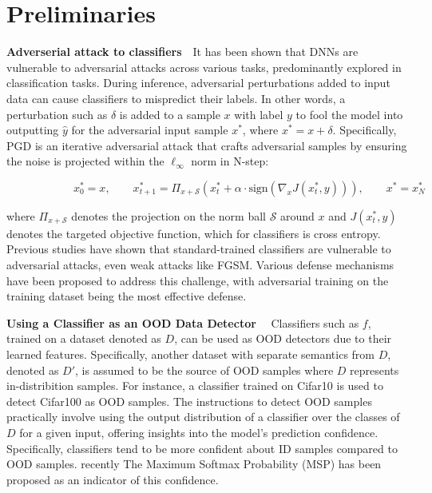 



\section{Preliminaries}

\textbf{Adverserial attack to classifiers}\ \ It has been shown that DNNs are vulnerable to adversarial attacks across various tasks, predominantly explored in classification tasks. During inference, adversarial perturbations added to input data can cause classifiers to mispredict their labels. In other words, a perturbation such as $\delta$ is added to a sample $x$ with label $y$ to fool the model into outputting \(\hat{y}\) for the adversarial input sample \(x^{*}\), where \(x^{*} = x + \delta\). Specifically, PGD is an iterative adversarial attack \cite{pgd} that crafts adversarial samples by ensuring the noise is projected within the \(\ell_{\infty}\) norm in N-step:

 $ \quad \quad  \quad \quad  \quad \quad x_{0}^{*} = x, \quad \quad x_{t+1}^{*} = \Pi_{x+\mathcal{S}} (x_{t}^{*} + \alpha \cdot \text{sign}\left(\nabla_x J\left( x_{t}^{*}, y\right)\right)),  \quad \quad  x^{*}=x_{N}^{*}$

where \(\Pi_{x+\mathcal{S}}\) denotes the projection on the norm ball \(\mathcal{S}\) around \(x\) and \( J\left( x_{t}^{*}, y \right) \) denotes the targeted objective function, which for classifiers is cross entropy. Previous studies have shown that standard-trained classifiers are vulnerable to adversarial attacks, even weak attacks like FGSM. Various defense mechanisms have been proposed to address this challenge, with adversarial training on the training dataset being the most effective defense.


\textbf{Using a Classifier as an OOD Data Detector} \ \ Classifiers such as $f$, trained on a dataset denoted as $D$, can be used as OOD detectors due to their learned features. Specifically, another dataset with separate semantics from $D$, denoted as $D'$, is assumed to be the source of OOD samples where $D$ represents in-distribition samples. For instance, a classifier trained on  Cifar10  is used to detect  Cifar100  as OOD samples.   The instructions to detect OOD samples practically involve using the output distribution of a classifier over the classes of $D$ for a given input, offering insights into the model's prediction confidence. Specifically, classifiers tend to be more confident about ID samples compared to OOD samples. recently The Maximum Softmax Probability (MSP) has been proposed as an indicator of this confidence.



